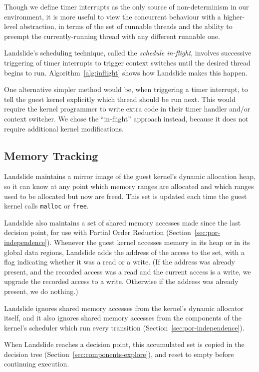 Though we define timer interrupts as the only source of non-determinism in our environment, it is more useful to view the concurrent behaviour with a higher-level abstraction, in terms of the set of runnable threads and the ability to preempt the currently-running thread with any different runnable one.

Landslide's scheduling technique, called the {\em schedule in-flight}, involves successive triggering of timer interrupts to trigger context switches until the desired thread begins to run. Algorithm~\ref{alg:inflight} shows how Landslide makes this happen.

One alternative simpler method would be, when triggering a timer interrupt, to tell the guest kernel explicitly which thread should be run next. This would require the kernel programmer to write extra code in their timer handler and/or context switcher. We chose the ``in-flight'' approach instead, because it does not require additional kernel modifications.

\subsection{Memory Tracking}
\label{sec:components-memory}

Landslide maintains a mirror image of the guest kernel's dynamic allocation heap, so it can know at any point which memory ranges are allocated and which ranges used to be allocated but now are freed. This set is updated each time the guest kernel calls \texttt{malloc} or \texttt{free}.

Landslide also maintains a set of shared memory accesses made since the last decision point, for use with Partial Order Reduction (Section~\ref{sec:por-independence}). Whenever the guest kernel accesses memory in its heap or in its global data regions, Landslide adds the address of the access to the set, with a flag indicating whether it was a read or a write. (If the address was already present, and the recorded access was a read and the current access is a write, we upgrade the recorded access to a write. Otherwise if the address was already present, we do nothing.)

Landslide ignores shared memory accesses from the kernel's dynamic allocator itself, and it also ignores shared memory accesses from the components of the kernel's scheduler which run every transition (Section~\ref{sec:por-independence}).

When Landslide reaches a decision point, this accumulated set is copied in the decision tree (Section~\ref{sec:components-explore}), and reset to empty before continuing execution.

